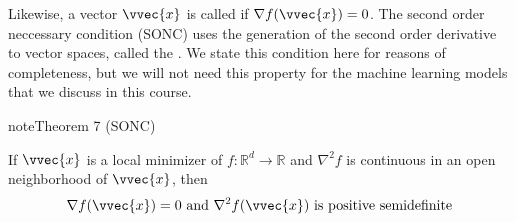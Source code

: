 \documentclass[letterpaper,10pt,english]{jupyterBook}
\begin{document}
\sphinxAtStartPar
Likewise, a vector \(\vvec{x}\) is called  if \(\nabla f(\vvec{x})=0\). The second order neccessary condition (SONC) uses the generation of the second order derivative to vector spaces, called the . We state this condition here for reasons of completeness, but we will not need this property for the machine learning models that we discuss in this course.
\label{optimization_analytic:theorem-2}
\begin{sphinxadmonition}{note}{Theorem 7 (SONC)}



\sphinxAtStartPar
If \(\vvec{x}\) is a local  minimizer of \(f:\mathbb{R}^d\rightarrow\mathbb{R}\) and \(\nabla^2f\) is continuous in an open
neighborhood of \(\vvec{x}\), then
\begin{equation*}
\begin{split}\nabla f(\vvec{x})=0 \text{ and } \nabla^2f(\vvec{x}) \text{ is positive semidefinite}\end{split}
\end{equation*}
\end{sphinxadmonition}
\end{document}
